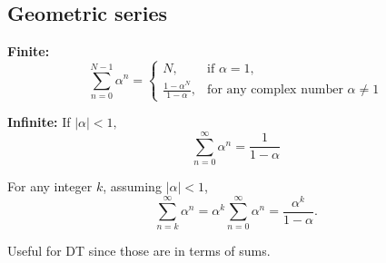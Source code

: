 \subsection{Geometric series}
\begin{definition}

    \textbf{Finite:}
    \begin{equation}
        \sum_{n=0}^{N-1} \alpha^n =
        \begin{cases}
        N, & \text{if } \alpha = 1, \\
        \frac{1 - \alpha^N}{1 - \alpha}, & \text{for any complex number } \alpha \neq 1
        \end{cases}
    \end{equation}

    \textbf{Infinite:} If $|\alpha| < 1,$
    \begin{equation}
        \sum_{n=0}^{\infty} \alpha^n = \frac{1}{1 - \alpha}
    \end{equation}

    For any integer \( k \), assuming \( |\alpha| < 1 \),
    \begin{equation}
        \sum_{n=k}^{\infty} \alpha^n = \alpha^k \sum_{n=0}^{\infty} \alpha^n = \frac{\alpha^k}{1 - \alpha}.
    \end{equation}
\end{definition}

\begin{intuition}
    Useful for DT since those are in terms of sums.
\end{intuition}

